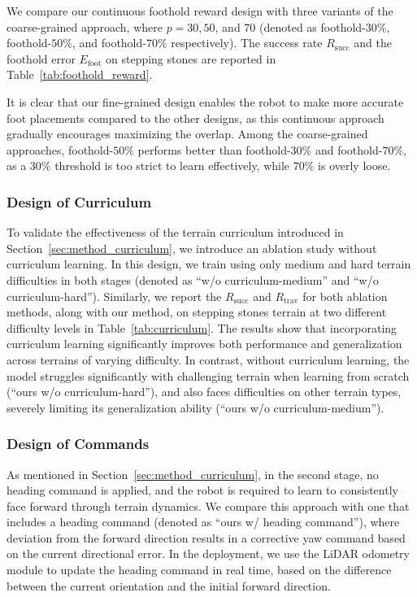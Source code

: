 We compare our continuous foothold reward design with three variants of the coarse-grained approach, where $p=30, 50$, and $70$ (denoted as foothold-$30\%$, foothold-$50\%$, and foothold-$70\%$ respectively). The success rate $R_\mathrm{succ}$ and the foothold error $E_\mathrm{foot}$ on stepping stones are reported in Table~\ref{tab:foothold_reward}.

It is clear that our fine-grained design enables the robot to make more accurate foot placements compared to the other designs, as this continuous approach gradually encourages maximizing the overlap. Among the coarse-grained approaches, foothold-$50\%$ performs better than foothold-$30\%$ and foothold-$70\%$, as a $30\%$ threshold is too strict to learn effectively, while $70\%$ is overly loose.

\subsubsection{Design of Curriculum}



To validate the effectiveness of the terrain curriculum introduced in Section~\ref{sec:method_curriculum}, we introduce an ablation study without curriculum learning. In this design, we train using only medium and hard terrain difficulties in both stages (denoted as ``w/o curriculum-medium'' and ``w/o curriculum-hard''). Similarly, we report the $R_\mathrm{succ}$ and $R_\mathrm{trav}$ for both ablation methods, along with our method, on stepping stones terrain at two different difficulty levels in Table~\ref{tab:curriculum}. The results show that incorporating curriculum learning significantly improves both performance and generalization across terrains of varying difficulty. In contrast, without curriculum learning, the model struggles significantly with challenging terrain when learning from scratch  (``ours w/o curriculum-hard''), and also faces difficulties on other terrain types, severely limiting its generalization ability (``ours w/o curriculum-medium'').

\subsubsection{Design of Commands}

As mentioned in Section~\ref{sec:method_curriculum}, in the second stage, no heading command is applied, and the robot is required to learn to consistently face forward through terrain dynamics. We compare this approach with one that includes a heading command (denoted as ``ours w/ heading command''), where deviation from the forward direction results in a corrective yaw command based on the current directional error. In the deployment, we use the LiDAR odometry module to update the heading command in real time, based on the difference between the current orientation and the initial forward direction.

